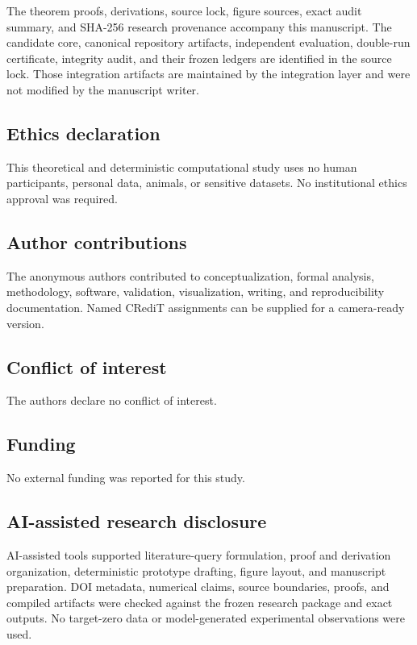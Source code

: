 The theorem proofs, derivations, source lock, figure sources, exact audit
summary, and SHA-256 research provenance accompany this manuscript.  The
candidate core, canonical repository artifacts, independent evaluation,
double-run certificate, integrity audit, and their frozen ledgers are
identified in the source lock.  Those integration artifacts are maintained
by the integration layer and were not modified by the manuscript writer.

\subsection*{Ethics declaration}

This theoretical and deterministic computational study uses no human
participants, personal data, animals, or sensitive datasets.  No
institutional ethics approval was required.

\subsection*{Author contributions}

The anonymous authors contributed to conceptualization, formal analysis,
methodology, software, validation, visualization, writing, and reproducibility
documentation.  Named CRediT assignments can be supplied for a camera-ready
version.

\subsection*{Conflict of interest}

The authors declare no conflict of interest.

\subsection*{Funding}

No external funding was reported for this study.

\subsection*{AI-assisted research disclosure}

AI-assisted tools supported literature-query formulation, proof and
derivation organization, deterministic prototype drafting, figure layout,
and manuscript preparation.  DOI metadata, numerical claims, source
boundaries, proofs, and compiled artifacts were checked against the frozen
research package and exact outputs.  No target-zero data or model-generated
experimental observations were used.
